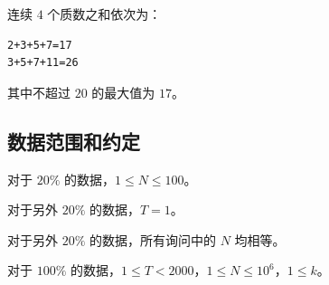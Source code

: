 连续 $4$ 个质数之和依次为：

\begin{lstlisting}
2+3+5+7=17
3+5+7+11=26
\end{lstlisting}

其中不超过 $20$ 的最大值为 $17$。


\subsection{数据范围和约定}

对于 $20\%$ 的数据，$1 \le N \le 100$。

对于另外 $20\%$ 的数据，$T = 1$。

对于另外 $20\%$ 的数据，所有询问中的 $N$ 均相等。

对于 $100\%$ 的数据，$1 \le T < 2000$，$1 \le N \le 10^6$，$1 \le k$。

